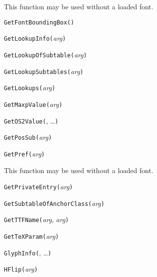 This function may be used without a loaded font.


\noindent\texttt{GetFontBoundingBox(}\texttt{)}


\noindent\texttt{GetLookupInfo(}\textit{arg}\texttt{)}


\noindent\texttt{GetLookupOfSubtable(}\textit{arg}\texttt{)}


\noindent\texttt{GetLookupSubtables(}\textit{arg}\texttt{)}


\noindent\texttt{GetLookups(}\textit{arg}\texttt{)}


\noindent\texttt{GetMaxpValue(}\textit{arg}\texttt{)}


\noindent\texttt{GetOS2Value(}, \ldots\texttt{)}


\noindent\texttt{GetPosSub(}\textit{arg}\texttt{)}


\noindent\texttt{GetPref(}\textit{arg}\texttt{)}

This function may be used without a loaded font.


\noindent\texttt{GetPrivateEntry(}\textit{arg}\texttt{)}


\noindent\texttt{GetSubtableOfAnchorClass(}\textit{arg}\texttt{)}


\noindent\texttt{GetTTFName(}\textit{arg}, \textit{arg}\texttt{)}


\noindent\texttt{GetTeXParam(}\textit{arg}\texttt{)}


\noindent\texttt{GlyphInfo(}, \ldots\texttt{)}


\noindent\texttt{HFlip(}\textit{arg}\texttt{)}

